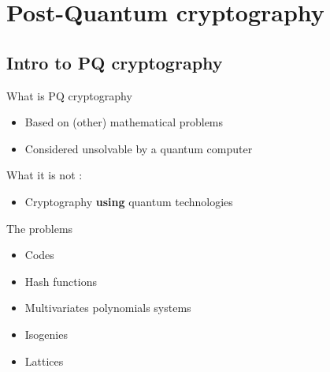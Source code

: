 \documentclass{beamer}
\begin{document}
\section{Post-Quantum cryptography}
\subsection{Intro to PQ cryptography}
\begin{frame}{What is PQ cryptography}
\begin{linenumbers}
	\begin{itemize}
		\item Based on (other) mathematical problems
		\item Considered unsolvable by a quantum computer
	\end{itemize}

	What it is not :
	\begin{itemize}
		\item Cryptography \textbf{using} quantum technologies
	\end{itemize}
\end{linenumbers}
\end{frame}

\begin{frame}{The problems}
	\begin{itemize}
		\item Codes
		\item Hash functions
		\item Multivariates polynomials systems
		\item Isogenies
		\item Lattices
	\end{itemize}
\end{frame}
\end{document}
